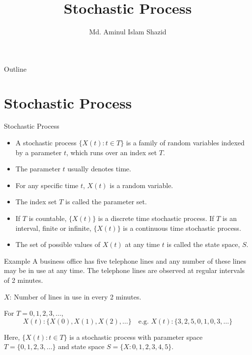 \documentclass[aspectratio=169]{beamer}
\title{Stochastic Process}
\author{Md. Aminul Islam Shazid}
\date{}
\begin{document}
    {
		\addtocounter{framenumber}{-2}
 
		\begin{frame}
			\titlepage
		\end{frame}
 
		\begin{frame}{Outline}
            \vfill
			\tableofcontents[subsectionstyle=hide]
            \vfill
		\end{frame}
	}
 
    \section{Stochastic Process}
 
    \begin{frame}{Stochastic Process}
        \begin{itemize}
            \item A stochastic process $\{X(t): t \in T\}$ is a family of random variables indexed by a parameter $t$, which runs over an index set $T$.
            \item The parameter $t$ usually denotes time.
            \item For any specific time $t$, $X(t)$ is a random variable.
            \item The index set $T$ is called the parameter set.
            \item If $T$ is countable, $\{X(t)\}$ is a discrete time stochastic process. If $T$ is an interval, finite or infinite, $\{X(t)\}$ is a continuous time stochastic process.
            \item The set of possible values of $X(t)$ at any time $t$ is called the state space, $S$.
        \end{itemize}
    \end{frame}
 
    \begin{frame}{Example}
        A business office has five telephone lines and any number of these lines may be in use at any time. The telephone lines are observed at regular intervals of 2 minutes.
 
        $X$: Number of lines in use in every 2 minutes.
 
        For $T = 0, 1, 2, 3, \ldots$,
        \[
        X(t): \{X(0), X(1), X(2), \ldots\} \quad \text{e.g. } X(t): \{3, 2, 5, 0, 1, 0, 3, \ldots\}
        \]
 
        Here, $\{X(t): t \in T\}$ is a stochastic process with parameter space $T = \{0, 1, 2, 3, \ldots\}$ and state space $S = \{X: 0, 1, 2, 3, 4, 5\}$.
    \end{frame}
 
\end{document}
